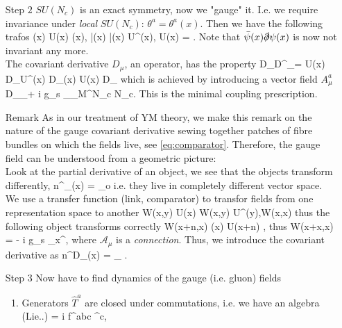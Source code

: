 \begin{enumerate}
	\item[Step $2$] $SU(N_c)$ is an exact symmetry, now we "gauge" it. I.e. we require invariance under \emph{local} $SU(N_c)$: $\theta^a=\theta^a(x)$. Then we have the following trafos
	\bse
	\psi(x) \rightarrow U(x) \psi(x),\; \bar{\psi}(x) \rightarrow \bar{\psi}(x) U^\dagger(x), \; U(x) = \exp {}.
	\ese 
	Note that $\bar{\psi}(x) \slashed{\partial} \psi(x)$ is now not invariant any more.\\
	The covariant derivative $D_\mu$, an operator, has the property
	\bse 
	D_\mu \rightarrow D^\prime_\mu = U(x) D_\mu U^\dagger(x) \; \Rightarrow \; D_\mu \psi(x) \rightarrow U(x) D_\mu \psi 
	\ese 
	which is achieved by introducing a vector field $A^a_\mu$
	\bse 
	D_\mu \equiv \partial_\mu + i g_s _{\mA_\mu \in M^{N_c \times N_c}}.
	\ese 
	This is the minimal coupling prescription.	
\item[Remark]
	As in our treatment of YM theory, we make this remark on the nature of the gauge covariant derivative sewing together patches of fibre bundles on which the fields live, see \ref{eq:comparator}. Therefore,  the gauge field can be understood from a geometric picture:\\
		Look at the partial derivative of an object, we see that the objects transform differently,
		\bse
		n^\mu \partial_\nu \Phi(x) = \lim_{\epsilon\rightarrow o}  
		\ese 
		i.e. they live in completely different vector space. We use a transfer function (link, comparator) to transfor fields from one representation space to another
		\bse 
		W(x,y) \rightarrow U(x) W(x,y) U^\dagger(y),\quad W(x,x) 
		\ese 
		thus the following object transforms correctly
		\bse 
		W(x+\epsilon n,x) \Phi(x) \rightarrow U(x+\epsilon n) \left[\dots\right],
		\ese 
		thus
		\bse 
		W(x+x,x) = \mI - i g_s \mA_\mu {}x^\mu,
		\ese 
		where $\mathcal{A}_\mu$ is a \emph{connection}. Thus, we introduce the covariant derivative as
		\be
		n^\mu D_\mu \Phi(x) = \lim_{\epsilon {}}  .
		\ee 
	\item[Step $3$] Now have to find dynamics of the gauge (i.e. gluon) fields
	\begin{enumerate}
		\item Generators $\hat{T}^a$ are closed under commutations, i.e. we have an algebra (Lie..)
		 = i f^{abc} ^c,

\end{enumerate}
\end{enumerate}
